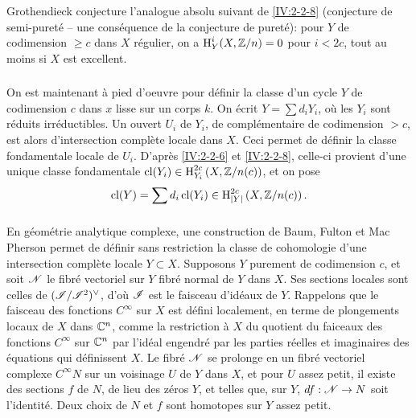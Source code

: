 \subsubsection{}\label{IV:2-2-9}

Grothendieck conjecture l'analogue absolu suivant de \ref{IV:2-2-8} (conjecture 
de semi-puret\'e -- une cons\'equence de la conjecture de puret\'e): pour $Y$ 
de codimension $\geqslant c$ dans $X$ r\'egulier, on a $\operatorname{H}_Y^i(X,\mathbb{Z}/n)=0$ pour 
$i<2 c$, tout au moins si $X$ est excellent. 





\subsubsection{}\label{IV:2-2-10}

On est maintenant \`a pied d'oeuvre pour d\'efinir la classe d'un cycle $Y$ de 
codimension $c$ dans $x$ lisse sur un corps $k$. On \'ecrit $Y=\sum d_i Y_i$, 
o\`u les $Y_i$ sont r\'eduits irr\'eductibles. Un ouvert $U_i$ de $Y_i$, de 
compl\'ementaire de codimension $>c$, est alors d'intersection compl\`ete 
locale dans $X$. Ceci permet de d\'efinir la classe fondamentale locale de 
$U_i$. D'apr\`es \ref{IV:2-2-6} et \ref{IV:2-2-8}, celle-ci provient d'une 
unique classe fondamentale $\operatorname{cl}(Y_i)\in \operatorname{H}_{Y_i}^{2 c}\left(X,\mathbb{Z}/n(c)\right)$, 
et on pose 
\[
  \operatorname{cl}(Y) = \sum d_i \operatorname{cl}(Y_i) \in \operatorname{H}_{|Y|}^{2 c}\left(X,\mathbb{Z}/n(c)\right) \text{.}
\]





\subsubsection{}\label{IV:2-2-11}

En g\'eom\'etrie analytique complexe, une construction de Baum, Fulton et 
Mac Pherson \cite{bfm75} permet de d\'efinir sans restriction la classe de 
cohomologie d'une intersection compl\`ete locale $Y\subset X$. Supposons $Y$ 
purement de codimension $c$, et soit $\mathscr{N}$ le fibr\'e vectoriel sur $Y$ fibr\'e 
normal de $Y$ dans $X$. Ses sections locales sont celles de $(\mathscr{I}/\mathscr{I}^2)^\vee$, 
d'o\`u $\mathscr{I}$ est le faisceau d'id\'eaux de $Y$. Rappelons que le faisceau des 
fonctions $C^\infty$ sur $X$ est d\'efini localement, en terme de plongements 
locaux de $X$ dans $\mathbb{C}^n$, comme la restriction \`a $X$ du quotient du 
faiceaux des fonctions $C^\infty$ sur $\mathbb{C}^n$ par l'id\'eal engendr\'e par les 
parties r\'eelles et imaginaires des \'equations qui d\'efinissent $X$. Le 
fibr\'e $\mathscr{N}$ se prolonge en un fibr\'e vectoriel complexe $C^\infty N$ sur un 
voisinage $U$ de $Y$ dans $X$, et pour $U$ assez petit, il existe des sections 
$f$ de $N$, de lieu des z\'eros $Y$, et telles que, sur $Y$, $d f:\mathscr{N}\to N$ 
soit l'identit\'e. Deux choix de $N$ et $f$ sont homotopes sur $Y$ assez petit. 

